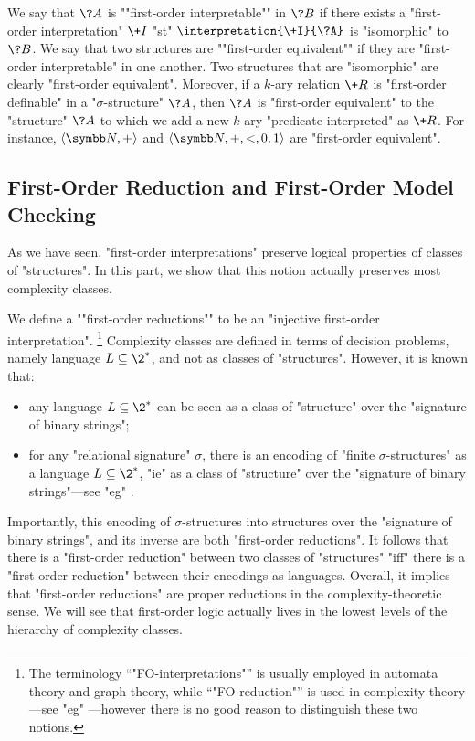 We say that $\?A$ is \AP""first-order interpretable"" in $\?B$ if there exists
a "first-order interpretation" $\+I$ "st" $\interpretation{\+I}{\?A}$ is "isomorphic" to $\?B$.
We say that two structures are \AP""first-order equivalent"" if they are "first-order interpretable" in one another. Two structures that are "isomorphic" are clearly
"first-order equivalent". Moreover, if a $k$-ary relation $\+R$ is "first-order definable"
in a "$\sigma$-structure" $\?A$, then $\?A$ is "first-order equivalent" to the "structure"
$\?A$ to which we add a new $k$-ary "predicate interpreted" as $\+R$.
For instance, $\tup{\N, +}$ and $\tup{\N, +, <, 0, 1}$ are "first-order equivalent".

\subsection{First-Order Reduction and First-Order Model Checking}

As we have seen, "first-order interpretations" preserve logical properties of classes
of "structures". In this part, we show that this notion actually preserves most complexity classes.

We define a \AP""first-order reductions"" to be an "injective first-order interpretation".%
\footnote{The terminology ``"FO-interpretations"'' is usually employed in automata theory and graph theory, while ``"FO-reduction"'' is used in complexity theory---see "eg" \cite[Definition 2.11 \& Definition 1.26]{Immerman1998DescriptiveComplexity}---however there is no good reason to
distinguish these two notions.}
Complexity classes are defined in terms of decision problems, namely 
language $L \subseteq \2^*$, and not as classes of "structures". 
However, it is known that:
\begin{itemize}
	\item any language $L \subseteq \2^*$
		can be seen as a class of "structure" over the "signature of binary strings";
	\item for any "relational signature" $\sigma$,
		there is an encoding of "finite $\sigma$-structures" as a language
		$L \subseteq \2^*$, "ie" as a class of "structure" over the "signature of binary strings"---see "eg" \cite[\S~2.2]{Immerman1998DescriptiveComplexity}.
\end{itemize}
Importantly, this encoding of $\sigma$-structures into structures over
the "signature of binary strings", and its inverse are both "first-order reductions".
It follows that there is a "first-order reduction" between two classes of "structures"
"iff" there is a "first-order reduction" between their encodings as languages.
Overall, it implies that "first-order reductions" are proper reductions in the complexity-theoretic 
sense. We will see that first-order logic actually lives in the lowest levels of the hierarchy of 
complexity classes.

